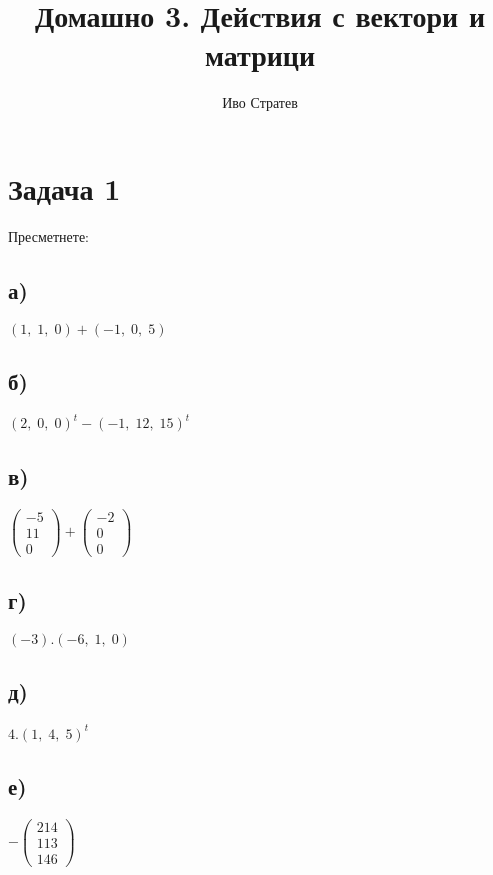 \documentclass[12pt]{article}
\title{Домашно 3. Действия с вектори и матрици}
\author{Иво Стратев}
\begin{document}
\maketitle

\section*{Задача 1}

Пресметнете:

\subsection*{а)}

$(1, \; 1, \; 0) + (-1, \; 0, \; 5)$

\subsection*{б)}

$(2, \; 0, \; 0)^t - (-1, \; 12, \; 15)^t$

\subsection*{в)}

$\begin{pmatrix} -5 \\ 11 \\ 0 \end{pmatrix} + \begin{pmatrix} -2 \\ 0 \\ 0 \end{pmatrix}$

\subsection*{г)}
    
$(-3).(-6, \; 1, \; 0)$
    
\subsection*{д)}
    
$4.(1, \; 4, \; 5)^t$
    
\subsection*{е)}
    
$-\begin{pmatrix} 214 \\ 113 \\ 146 \end{pmatrix}$
\end{document}
